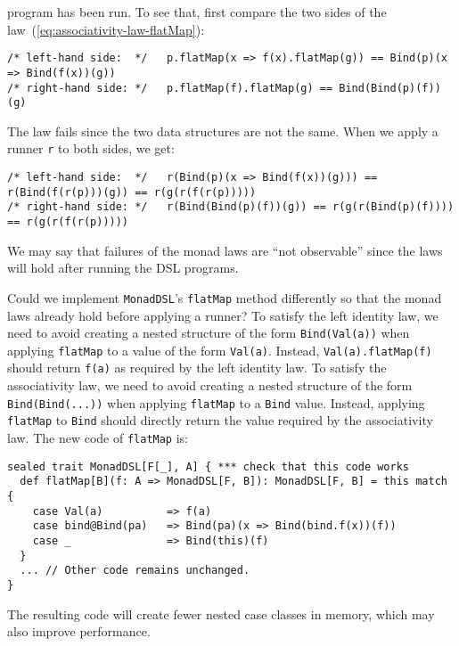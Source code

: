program has been run. To see that, first compare the two sides of
the law~(\ref{eq:associativity-law-flatMap}):
\begin{lstlisting}
/* left-hand side:  */   p.flatMap(x => f(x).flatMap(g)) == Bind(p)(x => Bind(f(x))(g))
/* right-hand side: */   p.flatMap(f).flatMap(g) == Bind(Bind(p)(f))(g)
\end{lstlisting}
The law fails since the two data structures are not the same. When
we apply a runner \lstinline!r!
to both sides, we get:
\begin{lstlisting}
/* left-hand side:  */   r(Bind(p)(x => Bind(f(x))(g))) == r(Bind(f(r(p)))(g)) == r(g(r(f(r(p)))))  
/* right-hand side: */   r(Bind(Bind(p)(f))(g)) == r(g(r(Bind(p)(f)))) == r(g(r(f(r(p)))))
\end{lstlisting}
We may say that failures of the monad laws are \textsf{``}not observable\textsf{''}
since the laws will hold after running the DSL programs.

Could we implement \lstinline!MonadDSL!\textsf{'}s
\lstinline!flatMap! method
differently so that the monad laws already hold before applying a
runner? To satisfy the left identity law, we need to avoid creating
a nested structure of the form \lstinline!Bind(Val(a))!
when applying \lstinline!flatMap!
to a value of the form \lstinline!Val(a)!.
Instead, \lstinline!Val(a).flatMap(f)!
should return \lstinline!f(a)!
as required by the left identity law. To satisfy the associativity
law, we need to avoid creating a nested structure of the form \lstinline!Bind(Bind(...))!
when applying \lstinline!flatMap!
to a \lstinline!Bind! value.
Instead, applying \lstinline!flatMap!
to \lstinline!Bind! should
directly return the value required by the associativity law. The new
code of \lstinline!flatMap!
is:
\begin{lstlisting}
sealed trait MonadDSL[F[_], A] { *** check that this code works
  def flatMap[B](f: A => MonadDSL[F, B]): MonadDSL[F, B] = this match {
    case Val(a)          => f(a)
    case bind@Bind(pa)   => Bind(pa)(x => Bind(bind.f(x))(f))
    case _               => Bind(this)(f)
  }
  ... // Other code remains unchanged.
}
\end{lstlisting}
The resulting code will create fewer nested case classes in memory,
which may also improve performance.

